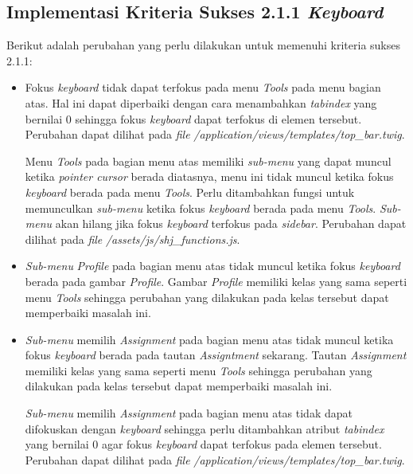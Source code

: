 \subsection{Implementasi Kriteria Sukses 2.1.1 \textit{Keyboard}}
\label{subsec:implementasi_A_2.1.1}
Berikut adalah perubahan yang perlu dilakukan untuk memenuhi kriteria sukses 2.1.1:

\begin{itemize}
	\item Fokus \textit{keyboard} tidak dapat terfokus pada menu \textit{Tools} pada menu bagian atas. Hal ini dapat diperbaiki dengan cara menambahkan \textit{tabindex} yang bernilai 0 sehingga fokus \textit{keyboard} dapat terfokus di elemen tersebut. Perubahan dapat dilihat pada \textit{file} \textit{/application/views/templates/top\_bar.twig}.
	
	Menu \textit{Tools} pada bagian menu atas memiliki \textit{sub-menu} yang dapat muncul ketika \textit{pointer cursor} berada diatasnya, menu ini tidak muncul ketika fokus \textit{keyboard} berada pada menu \textit{Tools}. Perlu ditambahkan fungsi untuk memunculkan \textit{sub-menu} ketika fokus \textit{keyboard} berada pada menu \textit{Tools}. \textit{Sub-menu} akan hilang jika fokus \textit{keyboard} terfokus pada \textit{sidebar}. Perubahan dapat dilihat pada \textit{file} \textit{/assets/js/shj\_functions.js}.

	\item \textit{Sub-menu} \textit{Profile} pada bagian menu atas tidak muncul ketika fokus \textit{keyboard} berada pada gambar \textit{Profile}. Gambar \textit{Profile} memiliki kelas yang sama seperti menu \textit{Tools} sehingga perubahan yang dilakukan pada kelas tersebut dapat memperbaiki masalah ini.
	
	\item \textit{Sub-menu} memilih \textit{Assignment} pada bagian menu atas tidak muncul ketika fokus \textit{keyboard} berada pada tautan \textit{Assigntment} sekarang. Tautan \textit{Assignment} memiliki kelas yang sama seperti menu \textit{Tools} sehingga perubahan yang dilakukan pada kelas tersebut dapat memperbaiki masalah ini.
	
	\textit{Sub-menu} memilih \textit{Assignment} pada bagian menu atas tidak dapat difokuskan dengan \textit{keyboard} sehingga perlu ditambahkan atribut \textit{tabindex} yang bernilai 0 agar fokus \textit{keyboard} dapat terfokus pada elemen tersebut. Perubahan dapat dilihat pada \textit{file} \textit{/application/views/templates/top\_bar.twig}.


\end{itemize}
